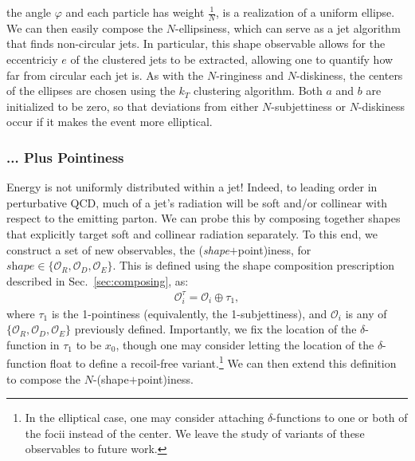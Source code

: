 \documentclass[letterpaper,11pt]{article}
\renewcommand{\O}{\mathcal{O}}
\DeclareRobustCommand{\Sec}[1]{Sec.~\ref{sec:#1}}
\begin{document}
                                                                                                                                                                                                                                                                                                                                                                                                                                                                                           the angle $\varphi$ and each particle has weight $\frac{1}{N}$, is a realization of a uniform ellipse. We can then easily compose the $N$-ellipsiness, which can serve as a jet algorithm that finds non-circular jets. In particular, this shape observable allows for the eccentriciy $e$ of the clustered jets to be extracted, allowing one to quantify how far from circular each jet is. As with the $N$-ringiness and $N$-diskiness, the centers of the ellipses are chosen using the $k_T$ clustering algorithm. Both $a$ and $b$ are initialized to be zero, so that deviations from either $N$-subjettiness or $N$-diskiness occur if it makes the event more elliptical.


\subsubsection{... Plus Pointiness}\label{sec:plus_pointiness}

Energy is not uniformly distributed within a jet! Indeed, to leading order in perturbative QCD, much of a jet's radiation will be soft and/or collinear with respect to the emitting parton. We can probe this by composing together shapes that explicitly target soft and collinear radiation separately. To this end, we construct a set of new observables, the (\textit{shape}$+$point)iness, for $\textit{shape} \in \{\O_R, \O_D, \O_E\}$. This is defined using the shape composition prescription described in \Sec{composing}, as:
%
\begin{align}
    \mathcal{O}_i^{\tau} = \O_i \oplus \tau_1,
\end{align}
%
where $\tau_1$ is the 1-pointiness (equivalently, the 1-subjettiness), and $\O_i$ is any of $\{\O_R, \O_D, \O_E\}$ previously defined. Importantly, we fix the location of the $\delta$-function in $\tau_1$ to be $x_0$, though one may consider letting the location of the $\delta$-function float to define a recoil-free variant.\footnote{In the elliptical case, one may consider attaching $\delta$-functions to one or both of the focii instead of the center. We leave the study of variants of these observables to future work.} We can then extend this definition to compose the $N$-(shape$+$point)iness. 
\end{document}
